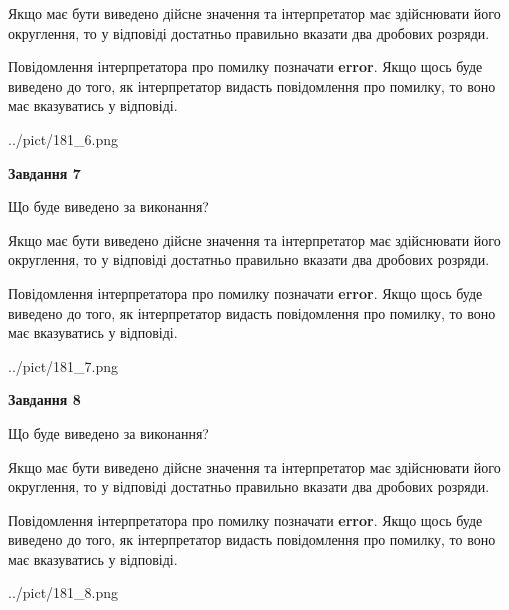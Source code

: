 \documentclass[12pt, ukrainian]{article}
\begin{document}
{\begin {Large}
Якщо має бути виведено дійсне значення та інтерпретатор має здійснювати його округлення, 
то у відповіді достатньо правильно вказати два дробових розряди.

Повідомлення інтерпретатора про помилку позначати \textbf{error}.
Якщо щось буде виведено до того, як інтерпретатор видасть повідомлення про помилку, 
то воно має вказуватись у відповіді. \par

\begin{center}
	{../pict/181_6.png}
\end{center}
\newpage

{\begin {center}\textbf{Завдання 7}\end {center}}\par
Що буде виведено за виконання? \par

Якщо має бути виведено дійсне значення та інтерпретатор має здійснювати його округлення, 
то у відповіді достатньо правильно вказати два дробових розряди.

Повідомлення інтерпретатора про помилку позначати \textbf{error}.
Якщо щось буде виведено до того, як інтерпретатор видасть повідомлення про помилку, 
то воно має вказуватись у відповіді. \par

\begin{center}
	{../pict/181_7.png}
\end{center}
\newpage

{\begin {center}\textbf{Завдання 8}\end {center}}\par
Що буде виведено за виконання? \par

Якщо має бути виведено дійсне значення та інтерпретатор має здійснювати його округлення, 
то у відповіді достатньо правильно вказати два дробових розряди.

Повідомлення інтерпретатора про помилку позначати \textbf{error}.
Якщо щось буде виведено до того, як інтерпретатор видасть повідомлення про помилку, 
то воно має вказуватись у відповіді. \par

\begin{center}
	{../pict/181_8.png}
\end{center}
\newpage


\end{Large}}
\end{document}
